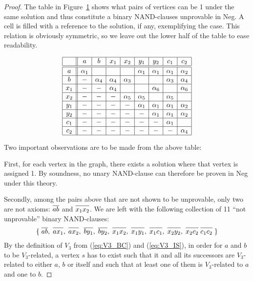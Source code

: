 \begin{proof}
The table in Figure~\ref{fig:v3_counter_table} shows what pairs of vertices can be 1 under the same solution and thus constitute a binary NAND-clauses unprovable in Neg.
A cell is filled with a reference to the solution, if any, exemplifying the case.
This relation is obviously symmetric, so we leave out the lower half of the table to ease readability.
\begin{figure}[!h]
  \centering
  \[\begin{array}{|c||c|c|c|c|c|c|c|c|}
    \hline
    & a & b & x_1 & x_2 & y_1 & y_2 & c_1 & c_2 \\ \hline\hline
    a & \alpha_1 & & & & \alpha_1 & \alpha_1 & \alpha_1 & \alpha_2 \\ \hline
    b &-& \alpha_4 & \alpha_4 & \alpha_3 & & & \alpha_3 & \alpha_4 \\ \hline
    x_1 &-&-& \alpha_4 & & & \alpha_6 & & \alpha_6 \\ \hline
    x_2 &-&-&-& \alpha_5 & \alpha_5 & & \alpha_5 & \\ \hline
    y_1 &-&-&-&-& \alpha_1 & \alpha_1 & \alpha_1 & \alpha_2 \\ \hline
    y_2 &-&-&-&-&-& \alpha_1 & \alpha_1 & \alpha_2 \\ \hline
    c_1 &-&-&-&-&-&-& \alpha_1 & \\ \hline
    c_2 &-&-&-&-&-&-&-& \alpha_4 \\ \hline
  \end{array}\]
  \caption{}
  \label{fig:v3_counter_table}
\end{figure}
\FloatBarrier
Two important observations are to be made from the above table:

First, for each vertex in the graph, there exists a solution where that vertex is assigned 1.
By soundness, no unary NAND-clause can therefore be proven in Neg under this theory.

Secondly, among the pairs above that are not shown to be unprovable, only two are not axioms: $\ol{ab}$ and $\ol{x_1x_2}$.
We are left with the following collection of 11 ``not unprovable'' binary NAND-clauses:
\begin{align}
  \{\; \ol{ab},\; \ol{ax_1},\; \ol{ax_2},\; \ol{by_1},\; \ol{by_2},\; \ol{x_1x_2},\; \ol{x_1y_1},\; \ol{x_1c_1},\; \ol{x_2y_2},\; \ol{x_2c_2} \; \ol{c_1c_2}\; \}
\end{align}
By the definition of $V_3$ from (\ref{eq:V3_BC}) and (\ref{eq:V3_IS}), in order for $a$ and $b$ to be $V_3$-related, a vertex $s$ has to exist such that it and all its successors are $V_3$-related to either $a$, $b$ or itself and such that at least one of them is $V_3$-related to $a$ and one to $b$.


\end{proof}
